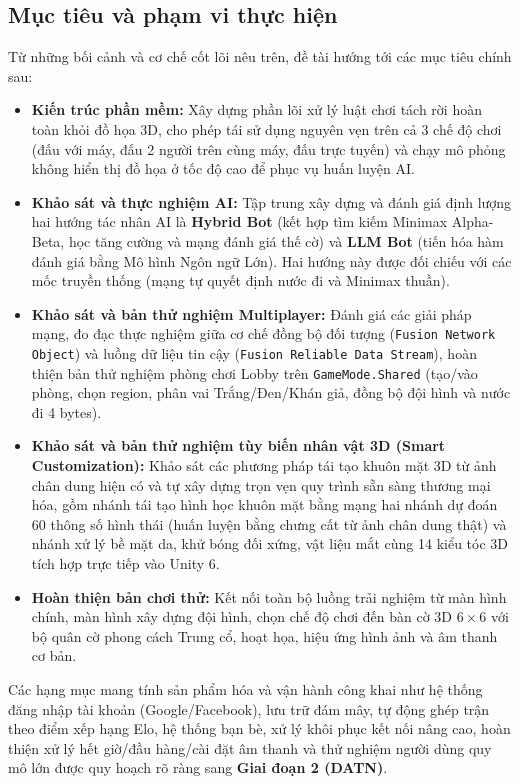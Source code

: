 \subsection{Mục tiêu và phạm vi thực hiện}
Từ những bối cảnh và cơ chế cốt lõi nêu trên, đề tài hướng tới các mục tiêu chính sau:
\begin{itemize}
    \item \textbf{Kiến trúc phần mềm:} Xây dựng phần lõi xử lý luật chơi tách rời hoàn toàn khỏi đồ họa 3D, cho phép tái sử dụng nguyên vẹn trên cả 3 chế độ chơi (đấu với máy, đấu 2 người trên cùng máy, đấu trực tuyến) và chạy mô phỏng không hiển thị đồ họa ở tốc độ cao để phục vụ huấn luyện AI.
    \item \textbf{Khảo sát và thực nghiệm AI:} Tập trung xây dựng và đánh giá định lượng hai hướng tác nhân AI là \textbf{Hybrid Bot} (kết hợp tìm kiếm Minimax Alpha-Beta, học tăng cường và mạng đánh giá thế cờ) và \textbf{LLM Bot} (tiến hóa hàm đánh giá bằng Mô hình Ngôn ngữ Lớn). Hai hướng này được đối chiếu với các mốc truyền thống (mạng tự quyết định nước đi và Minimax thuần).
    \item \textbf{Khảo sát và bản thử nghiệm Multiplayer:} Đánh giá các giải pháp mạng, đo đạc thực nghiệm giữa cơ chế đồng bộ đối tượng (\texttt{Fusion Network Object}) và luồng dữ liệu tin cậy (\texttt{Fusion Reliable Data Stream}), hoàn thiện bản thử nghiệm phòng chơi Lobby trên \texttt{GameMode.Shared} (tạo/vào phòng, chọn region, phân vai Trắng/Đen/Khán giả, đồng bộ đội hình và nước đi 4 bytes).
    \item \textbf{Khảo sát và bản thử nghiệm tùy biến nhân vật 3D (Smart Customization):} Khảo sát các phương pháp tái tạo khuôn mặt 3D từ ảnh chân dung hiện có và tự xây dựng trọn vẹn quy trình sẵn sàng thương mại hóa, gồm nhánh tái tạo hình học khuôn mặt bằng mạng hai nhánh dự đoán 60 thông số hình thái (huấn luyện bằng chưng cất từ ảnh chân dung thật) và nhánh xử lý bề mặt da, khử bóng đối xứng, vật liệu mắt cùng 14 kiểu tóc 3D tích hợp trực tiếp vào Unity 6.
    \item \textbf{Hoàn thiện bản chơi thử:} Kết nối toàn bộ luồng trải nghiệm từ màn hình chính, màn hình xây dựng đội hình, chọn chế độ chơi đến bàn cờ 3D $6 \times 6$ với bộ quân cờ phong cách Trung cổ, hoạt họa, hiệu ứng hình ảnh và âm thanh cơ bản.
\end{itemize}

Các hạng mục mang tính sản phẩm hóa và vận hành công khai như hệ thống đăng nhập tài khoản (Google/Facebook), lưu trữ đám mây, tự động ghép trận theo điểm xếp hạng Elo, hệ thống bạn bè, xử lý khôi phục kết nối nâng cao, hoàn thiện xử lý hết giờ/đầu hàng/cài đặt âm thanh và thử nghiệm người dùng quy mô lớn được quy hoạch rõ ràng sang \textbf{Giai đoạn 2 (DATN)}.

